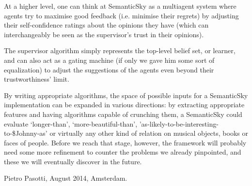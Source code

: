 \documentclass[11pt]{article}
\begin{document}
At a higher level, one can think at SemanticSky as a multiagent system where agents try to maximise good feedback (i.e. minimise their regrets) by adjusting their self-confidence ratings about the opinions they have (which can interchangeably be seen as the supervisor's trust in their opinions).

The supervisor algorithm simply represents the top-level belief set, or learner, and can also act as a gating machine (if only we gave him some sort of equalization) to adjust the suggestions of the agents even beyond their trustworthiness' limit.

By writing appropriate algorithms, the space of possible inputs for a SemanticSky implementation can be expanded in various directions: by extracting appropriate features and having algorithms capable of crunching them, a SemanticSky could evaluate `longer-than', `more-beautiful-than', 'as-likely-to-be-interesting-to-\$Johnny-as' or virtually any other kind of relation on musical objects, books or faces of people. Before we reach that stage, however, the framework will probably need some more refinement to counter the problems we already pinpointed, and these we will eventually discover in the future.

\flushright Pietro Pasotti, August 2014, Amsterdam.
\end{document}
